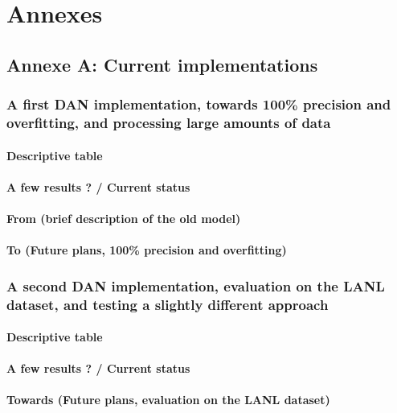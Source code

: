 \part*{Annexes}

\chapter*{Annexe A: Current implementations}

\makeatletter
\renewcommand{\thesection}{\@arabic\c@section}
\makeatother

\section{A first DAN implementation, towards 100\% precision and overfitting, and processing large amounts of data}

\subsection{Descriptive table}

\subsection{A few results ? / Current status}

\subsection{From (brief description of the old model)}

\subsection{To (Future plans, 100\% precision and overfitting)}

\section{A second DAN implementation, evaluation on the LANL dataset, and testing a slightly different approach}

\subsection{Descriptive table}

\subsection{A few results ? / Current status}

\subsection{Towards (Future plans, evaluation on the LANL dataset)}